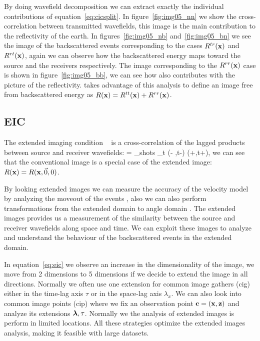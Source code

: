 By doing wavefield decomposition we can extract exactly the individual contributions of equation~\ref{eq:cicsplit}. In 
figure~\ref{fig:img05_nn} we show the cross-correlation between transmitted wavefields, this image is the main contribution
to the reflectivity of the earth. In figures~\ref{fig:img05_nb} and~\ref{fig:img05_bn} we see the image of the backscattered
events corresponding to the cases $R^{tr}({\bf x})$ and $R^{rt}({\bf x})$, again we can observe how the backscattered energy
maps toward the source and the receivers respectively. The image corresponding to the $R^{rr}({\bf x})$ case is shown in 
figure~\ref{fig:img05_bb}, we can see how also contributes with the picture of the reflectivity. \cite{fei:3130} takes 
advantage of this analysis to define an image free from backscattered energy as $R({\bf x})=R^{tt}({\bf x})+R^{rr}({\bf x})$.

\subsection{EIC}

The extended imaging condition ~\citep{sava:S209} is a cross-correlation of the lagged products between source
and receiver wavefields:
\beq
\Re= \sum_{shots} \sum_{t} \US(\xx - \hh,t-\tau) \UR(\xx+\hh,t+\tau),
\label{eq:eic}
\eeq
we can see that the conventional image is a special case of the extended image: $R({\bf x})=R({\bf x},\vec{0},0)$.

By looking extended images we can measure the accuracy of the velocity model by analyzing the moveout of the events
 \citep{yang:S151}, also we can also perform transformations from the extended domain to angle domain 
\citep{sava:S209,sava:S131}. The extended  images provides us a measurement of the similarity between the source
 and receiver wavefields along space and time.
 We can exploit these images to analyze and understand the behaviour of the backscattered events in the extended domain.

In equation~\ref{eq:eic} we observe an increase in the dimensionality of the image, we move from 2 dimensions to 5 dimensions
if we decide to extend the image in all directions. Normally we often use one extension for common image gathers (cig) either
in the time-lag axis $\tau$ or in the space-lag axis $\lambda_x$. We can also look into common image points (cip) where we 
fix an observation point $\bf c=(x,z)$ and analyze its extensions ${\boldsymbol{\lambda}},\tau$. Normally we the analysis of extended images 
is perform  in limited locations. All these strategies optimize the extended images analysis, making it feasible with 
large datasets.

